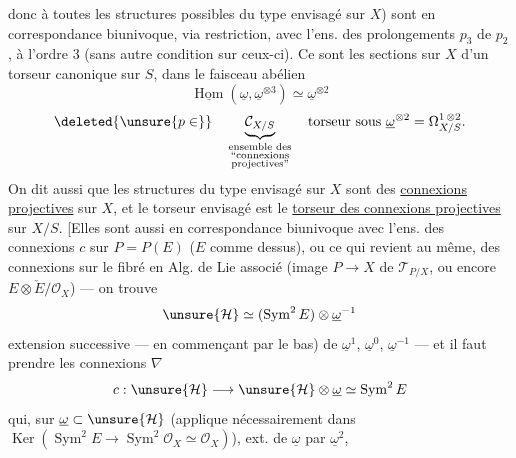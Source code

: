 donc à toutes les structures possibles du type envisagé sur $X$) sont en correspondance biunivoque, via restriction, avec l'ens. des prolongements $p_3$ de $p_2$, à l'ordre 3 (sans autre condition sur ceux-ci).
Ce sont  les sections sur $X$ d'un torseur canonique sur $S$, dans le faisceau abélien
\[\underline{\operatorname{Hom}}(\underline\omega,\underline\omega^{\otimes3})\simeq\underline\omega^{\otimes2}\]
\[
\deleted{\unsure{p\in}}\quad\underbrace{\mathcal C_{X/S}}_{\substack{\text{ensemble des}\\\text{``connexions}\\\text{projectives''}}}\quad\text{torseur sous }\underline\omega^{\otimes2}=\Omega^{1\,\otimes2}_{X/S}.
\]
On dit aussi que les structures du type envisagé sur $X$ sont des \uline{connexions projectives} sur $X$, et le torseur envisagé est le \uline{torseur des connexions projectives} sur $X/S$. [Elles sont aussi en correspondance biunivoque avec l'ens. des connexions  $c$ sur $P=P(E)$ ($E$ comme dessus), ou ce qui revient au même, des connexions  sur le fibré en Alg. de Lie associé (image  $P\longrightarrow X$ de $\mathcal T_{P/X}$, ou encore $E\otimes\check E/\mathcal O_X$) --- on trouve
\[\unsure{\mathcal H}\simeq(\operatorname{Sym}^2E)\otimes\underline\omega^{-1}\]
extension successive --- en commençant par le bas) de $\underline\omega^1$, $\underline\omega^0$, $\underline\omega^{-1}$ --- et il faut prendre les connexions $\nabla$
\[
c:\unsure{\mathcal H}\longrightarrow\unsure{\mathcal H}\otimes\underline\omega\simeq\operatorname{Sym}^2E
\]
qui, sur $\underline\omega\subset\unsure{\mathcal H}$ (applique nécessairement dans $\operatorname{Ker}(\operatorname{Sym}^2E\longrightarrow\operatorname{Sym}^2\mathcal O_X\simeq\mathcal O_X)$), ext. de $\underline\omega$ par $\underline\omega^2$,
